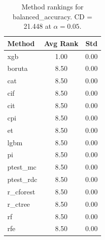 \begin{table}[h]
\centering
\caption{Method rankings for balanced_accuracy. CD = 21.448 at $\alpha=0.05$.}
\label{tab:ranks_balanced_accuracy}
\begin{tabular}{lcc}
\toprule
Method & Avg Rank & Std \\
\midrule
xgb & 1.00 & 0.00 \\
boruta & 8.50 & 0.00 \\
cat & 8.50 & 0.00 \\
cif & 8.50 & 0.00 \\
cit & 8.50 & 0.00 \\
cpi & 8.50 & 0.00 \\
et & 8.50 & 0.00 \\
lgbm & 8.50 & 0.00 \\
pi & 8.50 & 0.00 \\
ptest_mc & 8.50 & 0.00 \\
ptest_rdc & 8.50 & 0.00 \\
r_cforest & 8.50 & 0.00 \\
r_ctree & 8.50 & 0.00 \\
rf & 8.50 & 0.00 \\
rfe & 8.50 & 0.00 \\
\bottomrule
\end{tabular}
\end{table}